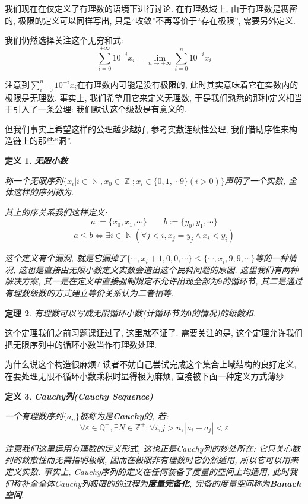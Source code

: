 \documentclass[UTF8]{ctexart}
\newcommand{\<}{\langle}
\renewcommand{\>}{\rangle}
\DeclareMathOperator{\Z}{\mathbb{Z}}
\DeclareMathOperator{\N}{\mathbb{N}}
\newtheorem{thm}{定理}[subsection]
\newtheorem{dfn}[thm]{定义}
\begin{document}
            我们现在在仅定义了有理数的语境下进行讨论. 在有理数域上, 由于有理数是稠密的, 极限的定义可以同样写出, 只是``收敛''不再等价于``存在极限'', 需要另外定义. 
            
            我们仍然选择关注这个无穷和式: 
            \[\sum_{i=0}^{+\infty}{10}^{-i} x_i=\lim_{n\to+\infty}\sum_{i=0}^{n}{10}^{-i} x_i\]

            注意到$\sum\limits_{i=0}^{n}{10}^{-i} x_i$在有理数内可能是没有极限的, 此时其实意味着它在实数内的极限是无理数. 事实上, 我们希望用它来定义无理数, 于是我们熟悉的那种定义相当于引入了一条公理: 我们默认这个级数是有意义的. 

            但我们事实上希望这样的公理越少越好, 参考实数连续性公理, 我们借助序性来构造链上的那些``洞''. 

            \begin{dfn}
                \textbf{无限小数}

                称一个无限序列$\{x_i|i\in\N,x_0\in\Z;x_i\in\{0,1,\cdots 9\}(i>0)\}$声明了一个实数, 全体这样的序列称为. 

                其上的序关系我们这样定义: 
                \[a:=\{x_0,x_1,\cdots\}\qquad b:=\{y_0,y_1,\cdots\}\]
                \[a\leq b\iff\exists i\in\N(\forall j<i, x_j=y_j\wedge x_i<y_i)\]

                这个定义有个漏洞, 就是它漏掉了$\{\cdots,x_i+1,0,0,\cdots\}\leq\{\cdots,x_i,9,9,\cdots\}$等的一种情况, 这也是直接由无限小数定义实数会造出这个民科问题的原因. 这里我们有两种解决方案, 其一是在定义中直接强制规定不允许出现全部为$9$的循环节, 其二是通过有理数级数的方式建立等价关系认为二者相等. 
            \end{dfn}
            
            \begin{thm}
                有理数可以写成无限循环小数(计循环节为$0$的情况)的级数和. 
            \end{thm}

            这个定理我们之前习题课证过了, 这里就不证了. 需要关注的是, 这个定理允许我们把无限序列中的循环小数当作有理数处理. 

            为什么说这个构造很麻烦? 读者不妨自己尝试完成这个集合上域结构的良好定义, 在要处理无限不循环小数乘积时显得极为麻烦, 直接被下面一种定义方式薄纱: 

            \begin{dfn}
				\textbf{Cauchy列(Cauchy Sequence)}

				一个有理数序列$\{a_n\}$被称为是\textbf{Cauchy}的, 若: 
				\[\forall\varepsilon\in\mathbb{Q}^+, \exists N\in\mathbb{Z}^+: \forall i,j>n, |a_{i}-a_{j}|<\varepsilon\]

                注意我们这里运用有理数的定义形式, 这也正是Cauchy列的妙处所在: 它只关心数列的敛散性而无需指明极限, 因而在极限非有理数时它仍然适用, 所以它可以用来定义实数. 事实上, Cauchy序列的定义在任何装备了度量的空间上均适用, 此时我们称补全全体Cauchy列极限的的过程为\textbf{度量完备化}, 完备的度量空间称为\textbf{Banach空间}. 
			\end{dfn}
\end{document}
